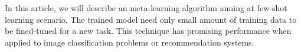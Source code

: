 \documentclass[11pt]{article}
\begin{document}
In this article, we will describe an meta-learning algorithm aiming at few-shot learning scenario. The trained model need only small amount of training data to be fined-tuned for a new task. This technique has promising performance when applied to image classification problems or recommendation systems.




% 






\end{document}
